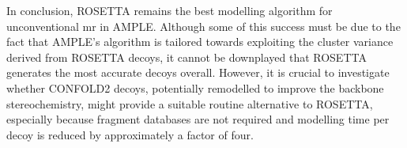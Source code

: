 In conclusion, ROSETTA remains the best modelling algorithm for unconventional \gls{mr} in AMPLE. Although some of this success must be due to the fact that AMPLE's algorithm is tailored towards exploiting the cluster variance derived from ROSETTA decoys, it cannot be downplayed that ROSETTA generates the most accurate decoys overall. However, it is crucial to investigate whether CONFOLD2 decoys, potentially remodelled to improve the backbone stereochemistry, might provide a suitable routine alternative to ROSETTA, especially because fragment databases are not required and modelling time per decoy is reduced by approximately a factor of four.
